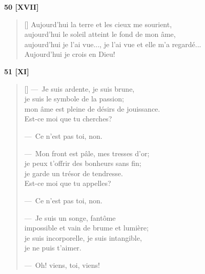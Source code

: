 \documentclass[a4paper,12pt]{book}
\begin{document}
\bigskip

\begin{center}
  \textbf{50 [XVII]}
\end{center}

\settowidth{\versewidth}{aujourd'hui je l'ai vue..., je l'ai vue et elle m'a regardé...}

\begin{verse}[\versewidth]
  Aujourd'hui la terre et les cieux me sourient, \\
  aujourd'hui le soleil atteint le fond de mon âme, \\
  aujourd'hui je l'ai vue..., je l'ai vue et elle m'a regardé... \\
  Aujourd'hui je crois en Dieu!
\end{verse}

\bigskip

\begin{center}
  \textbf{51 [XI]}
\end{center}

\settowidth{\versewidth}{de désirs de jouissance mon âme est pleine.}

\begin{verse}[\versewidth]
  ---~Je suis ardente, je suis brune, \\
  je suis le symbole de la passion; \\
  mon âme est pleine de désirs de jouissance. \\
  Est-ce moi que tu cherches?

  ---~Ce n'est pas toi, non.

  ---~Mon front est pâle, mes tresses d'or; \\
  je peux t'offrir des bonheurs sans fin; \\
  je garde un trésor de tendresse. \\
  Est-ce moi que tu appelles?

  ---~Ce n'est pas toi, non.

  ---~Je suis un songe, fantôme \\
  impossible et vain de brume et lumière; \\
  je suis incorporelle, je suis intangible, \\
  je ne puis t'aimer.

  ---~Oh! viens, toi, viens!
\end{verse}
\end{document}

